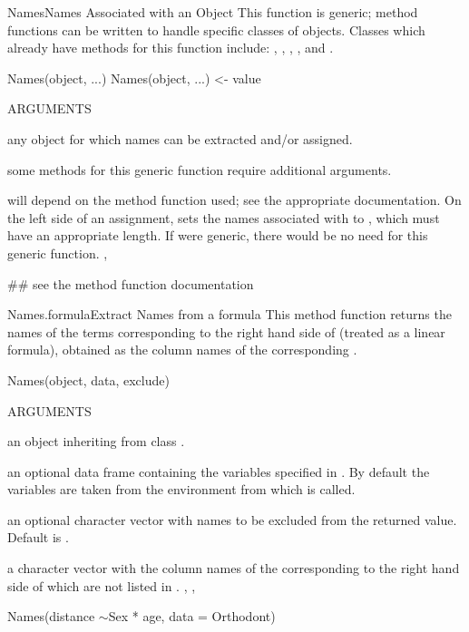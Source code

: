 \documentclass[pdftex]{article} \usepackage{url,graphicx}
\renewcommand{\Twiddle}{\mbox{\(\sim\)}}
\begin{document}
\begin{Helpfile}{Names}{Names Associated with an Object}
This function is generic; method functions can be written to handle
specific classes of objects. Classes which already have methods for
this function include: , ,
, , and .
\begin{Example}
Names(object, ...)
Names(object, ...) <- value
\end{Example}
\begin{Argument}{ARGUMENTS}
\item[\Co{object:}]
any object for which names can be extracted and/or assigned.
\item[\Co{...:}]
some methods for this generic function require additional
arguments.
\end{Argument}
will depend on the method function used; see the appropriate documentation.
On the left side of an assignment, sets the names associated with
 to , which must have an appropriate length.
 If  were generic, there would be no need for this generic
function.
, 
\need 15pt
\vspace{-16pt} 
\begin{Example}
## see the method function documentation
\end{Example}
\end{Helpfile}
\begin{Helpfile}{Names.formula}{Extract Names from a formula}
This method function returns the names of the terms corresponding to
the right hand side of  (treated as a linear formula),
obtained as the column names of the corresponding
.
\begin{Example}
Names(object, data, exclude)
\end{Example}
\begin{Argument}{ARGUMENTS}
\item[\Co{object:}]
an object inheriting from class .
\item[\Co{data:}]
an optional data frame containing the variables specified
in . By default the variables are taken from the
environment from which  is called.
\item[\Co{exclude:}]
an optional character vector with names to be excluded
from the returned value. Default is .
\end{Argument}
a character vector with the column names of the 
corresponding to the right hand side of  which are not
listed in .
, ,
\need 15pt
\vspace{-16pt} 
\begin{Example}
Names(distance \Twiddle Sex * age, data = Orthodont)
\end{Example}
\end{Helpfile}
\end{document}
